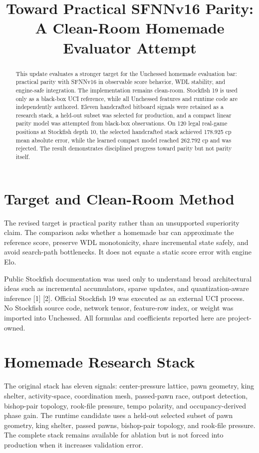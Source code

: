 \documentclass[10pt,conference]{IEEEtran}
\title{Toward Practical SFNNv16 Parity: A Clean-Room Homemade Evaluator Attempt}
\author{\IEEEauthorblockN{Manus AI}\IEEEauthorblockA{Unchessed UCI Engine Research\\September 2026}}
\begin{document}
\maketitle
\begin{abstract}
This update evaluates a stronger target for the Unchessed homemade evaluation bar: practical parity with SFNNv16 in observable score behavior, WDL stability, and engine-safe integration. The implementation remains clean-room. Stockfish 19 is used only as a black-box UCI reference, while all Unchessed features and runtime code are independently authored. Eleven handcrafted bitboard signals were retained as a research stack, a held-out subset was selected for production, and a compact linear parity model was attempted from black-box observations. On 120 legal real-game positions at Stockfish depth 10, the selected handcrafted stack achieved 178.925 cp mean absolute error, while the learned compact model reached 262.792 cp and was rejected. The result demonstrates disciplined progress toward parity but not parity itself.
\end{abstract}

\section{Target and Clean-Room Method}
The revised target is practical parity rather than an unsupported superiority claim. The comparison asks whether a homemade bar can approximate the reference score, preserve WDL monotonicity, share incremental state safely, and avoid search-path bottlenecks. It does not equate a static score error with engine Elo.

Public Stockfish documentation was used only to understand broad architectural ideas such as incremental accumulators, sparse updates, and quantization-aware inference [1] [2]. Official Stockfish 19 was executed as an external UCI process. No Stockfish source code, network tensor, feature-row index, or weight was imported into Unchessed. All formulas and coefficients reported here are project-owned.

\section{Homemade Research Stack}
The original stack has eleven signals: center-pressure lattice, pawn geometry, king shelter, activity-space, coordination mesh, passed-pawn race, outpost detection, bishop-pair topology, rook-file pressure, tempo polarity, and occupancy-derived phase gain. The runtime candidate uses a held-out selected subset of pawn geometry, king shelter, passed pawns, bishop-pair topology, and rook-file pressure. The complete stack remains available for ablation but is not forced into production when it increases validation error.
\end{document}
